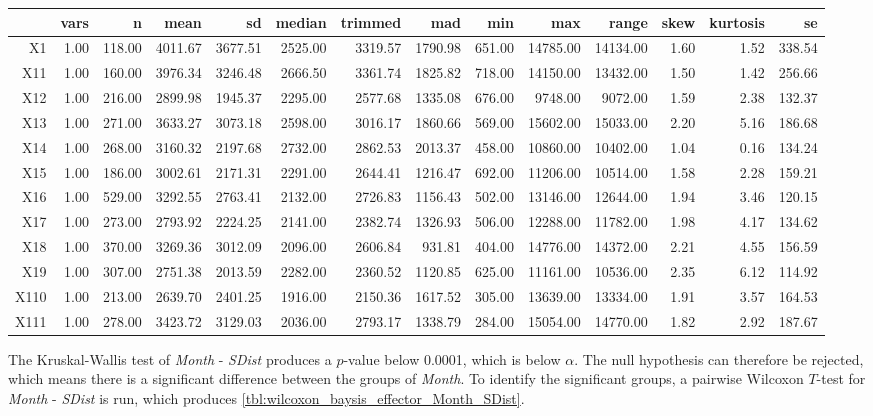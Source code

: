 \begin{tabular}{rrrrrrrrrrrrrr}
  \hline
 & vars & n & mean & sd & median & trimmed & mad & min & max & range & skew & kurtosis & se \\ 
  \hline
X1 & 1.00 & 118.00 & 4011.67 & 3677.51 & 2525.00 & 3319.57 & 1790.98 & 651.00 & 14785.00 & 14134.00 & 1.60 & 1.52 & 338.54 \\ 
  X11 & 1.00 & 160.00 & 3976.34 & 3246.48 & 2666.50 & 3361.74 & 1825.82 & 718.00 & 14150.00 & 13432.00 & 1.50 & 1.42 & 256.66 \\ 
  X12 & 1.00 & 216.00 & 2899.98 & 1945.37 & 2295.00 & 2577.68 & 1335.08 & 676.00 & 9748.00 & 9072.00 & 1.59 & 2.38 & 132.37 \\ 
  X13 & 1.00 & 271.00 & 3633.27 & 3073.18 & 2598.00 & 3016.17 & 1860.66 & 569.00 & 15602.00 & 15033.00 & 2.20 & 5.16 & 186.68 \\ 
  X14 & 1.00 & 268.00 & 3160.32 & 2197.68 & 2732.00 & 2862.53 & 2013.37 & 458.00 & 10860.00 & 10402.00 & 1.04 & 0.16 & 134.24 \\ 
  X15 & 1.00 & 186.00 & 3002.61 & 2171.31 & 2291.00 & 2644.41 & 1216.47 & 692.00 & 11206.00 & 10514.00 & 1.58 & 2.28 & 159.21 \\ 
  X16 & 1.00 & 529.00 & 3292.55 & 2763.41 & 2132.00 & 2726.83 & 1156.43 & 502.00 & 13146.00 & 12644.00 & 1.94 & 3.46 & 120.15 \\ 
  X17 & 1.00 & 273.00 & 2793.92 & 2224.25 & 2141.00 & 2382.74 & 1326.93 & 506.00 & 12288.00 & 11782.00 & 1.98 & 4.17 & 134.62 \\ 
  X18 & 1.00 & 370.00 & 3269.36 & 3012.09 & 2096.00 & 2606.84 & 931.81 & 404.00 & 14776.00 & 14372.00 & 2.21 & 4.55 & 156.59 \\ 
  X19 & 1.00 & 307.00 & 2751.38 & 2013.59 & 2282.00 & 2360.52 & 1120.85 & 625.00 & 11161.00 & 10536.00 & 2.35 & 6.12 & 114.92 \\ 
  X110 & 1.00 & 213.00 & 2639.70 & 2401.25 & 1916.00 & 2150.36 & 1617.52 & 305.00 & 13639.00 & 13334.00 & 1.91 & 3.57 & 164.53 \\ 
  X111 & 1.00 & 278.00 & 3423.72 & 3129.03 & 2036.00 & 2793.17 & 1338.79 & 284.00 & 15054.00 & 14770.00 & 1.82 & 2.92 & 187.67 \\ 
   \hline
\end{tabular}

The Kruskal-Wallis test of \textit{Month} - \textit{SDist} produces a $p$-value below 0.0001, which is below $\alpha$. The null hypothesis can therefore be rejected, which means there is a significant difference between the groups of \textit{Month}. To identify the significant groups, a pairwise Wilcoxon $T$-test for \textit{Month} - \textit{SDist} is run, which produces \cref{tbl:wilcoxon_baysis_effector_Month_SDist}. 

